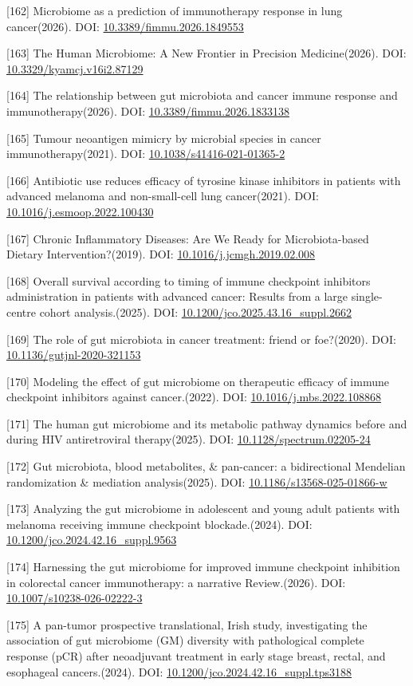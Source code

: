 \documentclass[11pt]{article}
\begin{document}
{[}162{]} Microbiome as a prediction of immunotherapy response in lung cancer(2026). DOI: \url{10.3389/fimmu.2026.1849553}

{[}163{]} The Human Microbiome: A New Frontier in Precision Medicine(2026). DOI: \url{10.3329/kyamcj.v16i2.87129}

{[}164{]} The relationship between gut microbiota and cancer immune response and immunotherapy(2026). DOI: \url{10.3389/fimmu.2026.1833138}

{[}165{]} Tumour neoantigen mimicry by microbial species in cancer immunotherapy(2021). DOI: \url{10.1038/s41416-021-01365-2}

{[}166{]} Antibiotic use reduces efficacy of tyrosine kinase inhibitors in patients with advanced melanoma and non-small-cell lung cancer(2021). DOI: \url{10.1016/j.esmoop.2022.100430}

{[}167{]} Chronic Inflammatory Diseases: Are We Ready for Microbiota-based Dietary Intervention?(2019). DOI: \url{10.1016/j.jcmgh.2019.02.008}

{[}168{]} Overall survival according to timing of immune checkpoint inhibitors administration in patients with advanced cancer: Results from a large single-centre cohort analysis.(2025). DOI: \url{10.1200/jco.2025.43.16_suppl.2662}

{[}169{]} The role of gut microbiota in cancer treatment: friend or foe?(2020). DOI: \url{10.1136/gutjnl-2020-321153}

{[}170{]} Modeling the effect of gut microbiome on therapeutic efficacy of immune checkpoint inhibitors against cancer.(2022). DOI: \url{10.1016/j.mbs.2022.108868}

{[}171{]} The human gut microbiome and its metabolic pathway dynamics before and during HIV antiretroviral therapy(2025). DOI: \url{10.1128/spectrum.02205-24}

{[}172{]} Gut microbiota, blood metabolites, \& pan-cancer: a bidirectional Mendelian randomization \& mediation analysis(2025). DOI: \url{10.1186/s13568-025-01866-w}

{[}173{]} Analyzing the gut microbiome in adolescent and young adult patients with melanoma receiving immune checkpoint blockade.(2024). DOI: \url{10.1200/jco.2024.42.16_suppl.9563}

{[}174{]} Harnessing the gut microbiome for improved immune checkpoint inhibition in colorectal cancer immunotherapy: a narrative Review.(2026). DOI: \url{10.1007/s10238-026-02222-3}

{[}175{]} A pan-tumor prospective translational, Irish study, investigating the association of gut microbiome (GM) diversity with pathological complete response (pCR) after neoadjuvant treatment in early stage breast, rectal, and esophageal cancers.(2024). DOI: \url{10.1200/jco.2024.42.16_suppl.tps3188}
\end{document}
